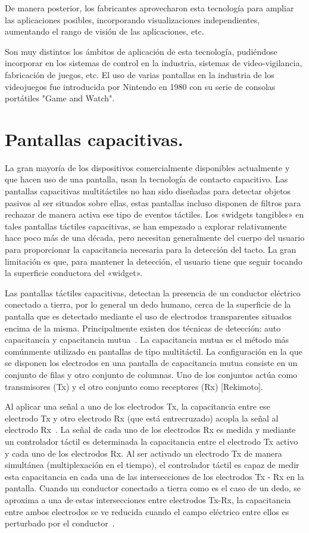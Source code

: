 De manera posterior, los fabricantes aprovecharon esta tecnología para ampliar las aplicaciones posibles, incorporando visualizaciones independientes, aumentando el rango de visión de las aplicaciones, etc.

Son muy distintos los ámbitos de aplicación de esta tecnología, pudiéndose incorporar en los sistemas de control en la industria, sistemas de video-vigilancia, fabricación de juegos, etc.
El uso de varias pantallas en la industria de los videojuegos fue introducida por Nintendo en 1980 con su serie de consolas portátiles "Game and Watch".


\section{Pantallas capacitivas.}
La gran mayoría de los dispositivos comercialmente disponibles actualmente y que hacen uso de una pantalla, usan la tecnología de contacto capacitivo.
Las pantallas capacitivas multitáctiles no han sido diseñadas para detectar objetos pasivos al ser situados sobre ellas, estas pantallas incluso disponen de filtros para rechazar de manera activa ese tipo de eventos táctiles.
Los «widgets tangibles» en tales pantallas táctiles capacitivas, se han empezado a explorar relativamente hace poco más de una década\cite{Rekimoto}, pero necesitan generalmente del cuerpo del usuario para proporcionar la capacitancia necesaria para la detección del tacto. La gran limitación es que, para mantener la detección, el usuario tiene que seguir tocando la superficie conductora del «widget».

Las pantallas táctiles capacitivas, detectan la presencia de un conductor eléctrico conectado a tierra, por lo general un dedo humano, cerca de la superficie de la pantalla que es detectado mediante el uso de electrodos transparentes situados encima de la misma.
Principalmente existen dos técnicas de detección: auto capacitancia y capacitancia mutua~\cite{Barrett}. La capacitancia mutua es el método más comúnmente utilizado en pantallas de tipo multitáctil.
La configuración en la que se disponen los electrodos en una pantalla de capacitancia mutua consiste en un conjunto de filas y otro conjunto de columnas. Uno de los conjuntos actúa como transmisores (Tx) y el otro conjunto como receptores (Rx) [Rekimoto].

Al aplicar una señal a uno de los electrodos Tx, la capacitancia entre ese electrodo Tx y otro electrodo Rx (que está entrecruzado) acopla la señal al electrodo Rx~\cite{Silicon}. La señal de cada uno de los electrodos Rx es medida y mediante un controlador táctil es determinada la capacitancia entre el electrodo Tx activo y cada uno de los electrodos Rx. Al ser activado un electrodo Tx de manera simultánea (multiplexación en el tiempo), el controlador táctil es capaz de medir esta capacitancia en cada una de las intersecciones de los electrodos Tx - Rx en la pantalla.
Cuando un conductor conectado a tierra como es el caso de un dedo, se aproxima a una de estas intersecciones entre electrodos Tx-Rx, la capacitancia entre ambos electrodos se ve reducida cuando el campo eléctrico entre ellos es perturbado por el conductor~\cite{Zimmerman}.

